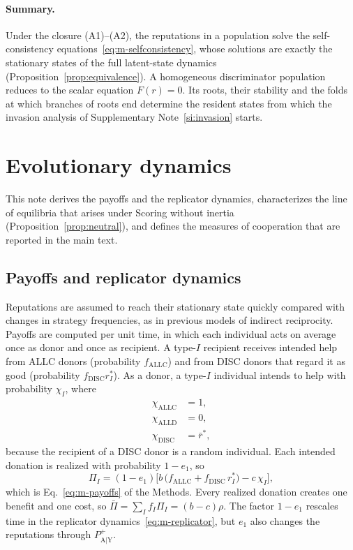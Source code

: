 \documentclass[10pt]{wlscirep}
\newcommand{\Pp}[1]{P^{+}_{\mathrm{#1}}}   %
\newcommand{\ALLC}{\mathrm{ALLC}}
\newcommand{\ALLD}{\mathrm{ALLD}}
\newcommand{\DISC}{\mathrm{DISC}}
\theoremstyle{plain}
\theoremstyle{remark}
\begin{document}
\paragraph{Summary.} Under the closure (A1)--(A2), the reputations in a population solve the self-consistency equations~\eqref{eq:m-selfconsistency}, whose solutions are exactly the stationary states of the full latent-state dynamics (Proposition~\ref{prop:equivalence}). A homogeneous discriminator population reduces to the scalar equation $F(r)=0$. Its roots, their stability and the folds at which branches of roots end determine the resident states from which the invasion analysis of Supplementary Note~\ref{si:invasion} starts.

\FloatBarrier
\section{Evolutionary dynamics}
\label{si:evolution}

This note derives the payoffs and the replicator dynamics, characterizes the line of equilibria that arises under Scoring without inertia (Proposition~\ref{prop:neutral}), and defines the measures of cooperation that are reported in the main text.

\subsection{Payoffs and replicator dynamics}

Reputations are assumed to reach their stationary state quickly compared with changes in strategy frequencies, as in previous models of indirect reciprocity. Payoffs are computed per unit time, in which each individual acts on average once as donor and once as recipient. A type-$I$ recipient receives intended help from ALLC donors (probability $f_{\ALLC}$) and from DISC donors that regard it as good (probability $f_{\DISC}r^*_I$). As a donor, a type-$I$ individual intends to help with probability $\chi_I$, where
\begin{equation}
\begin{aligned}
\chi_{\ALLC}&=1,\\
\chi_{\ALLD}&=0,\\
\chi_{\DISC}&=\bar r^*,
\end{aligned}
\label{eq:s-chi}
\end{equation}
because the recipient of a DISC donor is a random individual. Each intended donation is realized with probability $1-e_1$, so
\begin{equation}
\Pi_I=(1-e_1)\bigl[b\,\bigl(f_{\ALLC}+f_{\DISC}\,r^*_I\bigr)-c\,\chi_I\bigr],
\label{eq:s-payoffs}
\end{equation}
which is Eq.~\eqref{eq:m-payoffs} of the Methods. Every realized donation creates one benefit and one cost, so $\bar\Pi=\sum_If_I\Pi_I=(b-c)\rho$. The factor $1-e_1$ rescales time in the replicator dynamics~\eqref{eq:m-replicator}, but $e_1$ also changes the reputations through $\Pp{A|Y}$.
\end{document}
